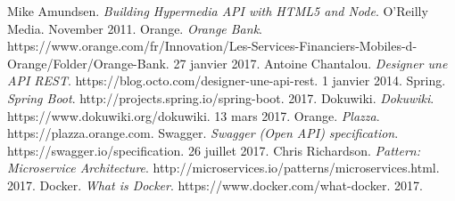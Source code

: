 %
\begin{thebibliography}{ABC}
     Mike Amundsen. \emph{Building Hypermedia API with HTML5 and Node}. O'Reilly Media. November 2011.
     Orange. \emph{Orange Bank}. https://www.orange.com/fr/Innovation/Les-Services-Financiers-Mobiles-d-Orange/Folder/Orange-Bank. 27 janvier 2017.
     Antoine Chantalou. \emph{Designer une API REST}. https://blog.octo.com/designer-une-api-rest. 1 janvier 2014.
     Spring. \emph{Spring Boot}. http://projects.spring.io/spring-boot. 2017.
     Dokuwiki. \emph{Dokuwiki}. https://www.dokuwiki.org/dokuwiki. 13 mars 2017.
     Orange. \emph{Plazza}. https://plazza.orange.com.
     Swagger. \emph{Swagger (Open API) specification}. https://swagger.io/specification. 26 juillet 2017.
     Chris Richardson. \emph{Pattern: Microservice Architecture}. http://microservices.io/patterns/microservices.html. 2017.
     Docker. \emph{What is Docker}. https://www.docker.com/what-docker. 2017.
%
\end{thebibliography}
